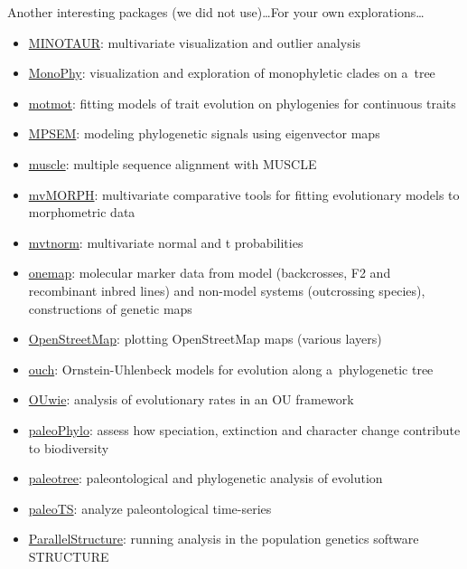 \documentclass[compress, ucs, xelatex, 11pt, xcolor=svgnames, aspectratio=169,
	hyperref={
		bookmarks=true,
		unicode=true,
		colorlinks=true,
		pdftitle={Molecular data in R},
		plainpages=false,
		pdfauthor={Vojtech Zeisek},
		pdfsubject={Course about phylogeny and evolution in R},
		pdfcreator={XeLaTeX},
		pdfkeywords={R, evolution, phylogeny, molecular data},
		linkcolor=Crimson, %
		anchorcolor=Magenta, %
		citecolor=Magenta, %
		filecolor=Magenta, %
		menucolor=Magenta, %
		urlcolor=DodgerBlue, %
		pdftex},
	url={hyphens, lowtilde} %
	]{beamer}
\begin{document}
\begin{frame}[allowframebreaks]{Another interesting packages (we did not use)\ldots}{For your own explorations\ldots}
\begin{itemize}
		\item \href{https://github.com/NESCent/MINOTAUR}{MINOTAUR}: multivariate visualization and outlier analysis
		\item \href{https://CRAN.R-project.org/package=MonoPhy}{MonoPhy}: visualization and exploration of monophyletic clades on a~tree
		\item \href{https://CRAN.R-project.org/package=motmot}{motmot}: fitting models of trait evolution on phylogenies for continuous traits
		\item \href{https://CRAN.R-project.org/package=MPSEM}{MPSEM}: modeling phylogenetic signals using eigenvector maps
		\item \href{https://bioconductor.org/packages/release/bioc/html/muscle.html}{muscle}: multiple sequence alignment with MUSCLE
		\item \href{https://CRAN.R-project.org/package=mvMORPH}{mvMORPH}: multivariate comparative tools for fitting evolutionary models to morphometric data
		\item \href{https://CRAN.R-project.org/package=mvtnorm}{mvtnorm}: multivariate normal and t probabilities
		\item \href{https://CRAN.R-project.org/package=onemap}{onemap}: molecular marker data from model (backcrosses, F2 and recombinant inbred lines) and non-model systems (outcrossing species), constructions of genetic maps
		\item \href{https://CRAN.R-project.org/package=OpenStreetMap}{OpenStreetMap}: plotting OpenStreetMap maps (various layers)
		\item \href{https://CRAN.R-project.org/package=ouch}{ouch}: Ornstein-Uhlenbeck models for evolution along a~phylogenetic tree
		\item \href{https://CRAN.R-project.org/package=OUwie}{OUwie}: analysis of evolutionary rates in an OU framework
		\item \href{https://r-forge.r-project.org/projects/paleophylo/}{paleoPhylo}: assess how speciation, extinction and character change contribute to biodiversity
		\item \href{https://CRAN.R-project.org/package=paleotree}{paleotree}: paleontological and phylogenetic analysis of evolution
		\item \href{https://CRAN.R-project.org/package=paleoTS}{paleoTS}: analyze paleontological time-series
		\item \href{https://r-forge.r-project.org/projects/parallstructure/}{ParallelStructure}: running analysis in the population genetics software STRUCTURE

\end{itemize}
\end{frame}
\end{document}
